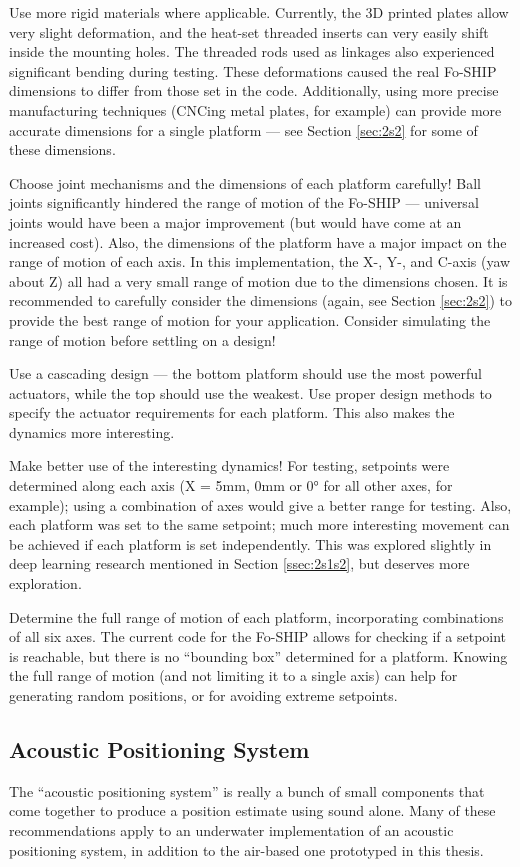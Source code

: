 \documentclass[11pt]{ucthesisCP}
\begin{document}
Use more rigid materials where applicable. Currently, the 3D printed plates allow very slight deformation, and the heat-set threaded inserts can very easily shift inside the mounting holes. The threaded rods used as linkages also experienced significant bending during testing. These deformations caused the real Fo-SHIP dimensions to differ from those set in the code. Additionally, using more precise manufacturing techniques (CNCing metal plates, for example) can provide more accurate dimensions for a single platform --- see Section \ref{sec:2s2} for some of these dimensions.

Choose joint mechanisms and the dimensions of each platform carefully! Ball joints significantly hindered the range of motion of the Fo-SHIP --- universal joints would have been a major improvement (but would have come at an increased cost). Also, the dimensions of the platform have a major impact on the range of motion of each axis. In this implementation, the X-, Y-, and C-axis (yaw about Z) all had a very small range of motion due to the dimensions chosen. It is recommended to carefully consider the dimensions (again, see Section \ref{sec:2s2}) to provide the best range of motion for your application. Consider simulating the range of motion before settling on a design!

Use a cascading design --- the bottom platform should use the most powerful actuators, while the top should use the weakest. Use proper design methods to specify the actuator requirements for each platform. This also makes the dynamics more interesting.

Make better use of the interesting dynamics! For testing, setpoints were determined along each axis (X = 5mm, 0mm or 0° for all other axes, for example); using a combination of axes would give a better range for testing. Also, each platform was set to the same setpoint; much more interesting movement can be achieved if each platform is set independently. This was explored slightly in deep learning research mentioned in Section \ref{ssec:2s1s2}, but deserves more exploration.

Determine the full range of motion of each platform, incorporating combinations of all six axes. The current code for the Fo-SHIP allows for checking if a setpoint is reachable, but there is no “bounding box” determined for a platform. Knowing the full range of motion (and not limiting it to a single axis) can help for generating random positions, or for avoiding extreme setpoints.

\subsection{Acoustic Positioning System} \label{sec:7s1s3}
The “acoustic positioning system” is really a bunch of small components that come together to produce a position estimate using sound alone. Many of these recommendations apply to an underwater implementation of an acoustic positioning system, in addition to the air-based one prototyped in this thesis.
\end{document}
